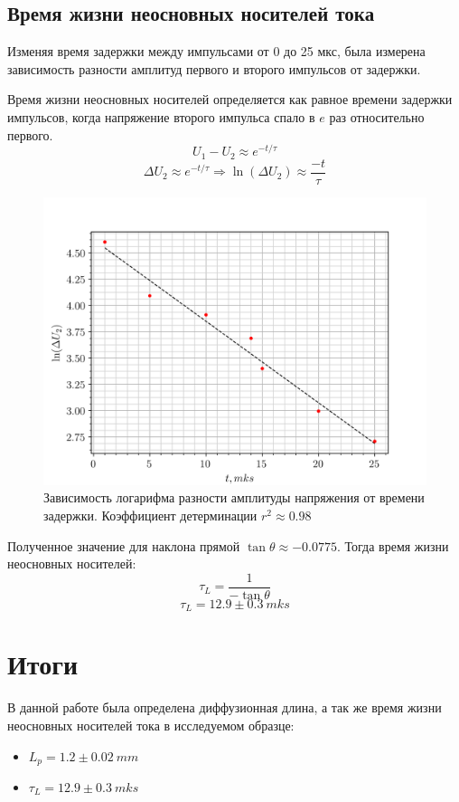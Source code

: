 \subsection*{Время жизни неосновных носителей тока}
Изменяя время задержки между импульсами от 0 до 25 мкс, была измерена зависимость разности амплитуд первого и второго
импульсов от задержки.

Время жизни неосновных носителей определяется как равное времени задержки импульсов, когда напряжение второго импульса
спало в $e$ раз относительно первого. 
$$ U_1 - U_2 \approx e^{-t/\tau}$$ 
$$\Delta U_2 \approx e^{-t/\tau} \Rightarrow \ln(\Delta U_2) \approx \frac{-t}{\tau}$$   
\begin{figure}[H]
	\centering
	\includegraphics[width=.8\linewidth]{graphs/task2.png}
	\caption{Зависимость логарифма разности амплитуды напряжения от времени задержки. Коэффициент детерминации $r^2 \approx 0.98$}
	\label{fig:exp.2}
\end{figure}
Полученное значение для наклона прямой $\tan \theta \approx -0.0775 $. Тогда время жизни неосновных носителей:
$$\tau_L = \frac{1}{-\tan \theta} $$
$$ \tau_L = 12.9 \pm 0.3~mks $$

\section*{Итоги}
В данной работе была определена диффузионная длина, а так же время жизни неосновных носителей тока в исследуемом
образце:
\begin{itemize}
	\item $L_p = 1.2\pm0.02~mm$
	\item $\tau_L = 12.9\pm 0.3~mks$
\end{itemize} 

